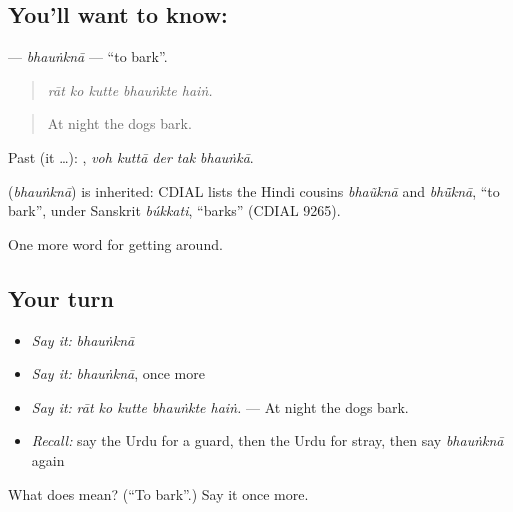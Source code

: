 \subsection*{You'll want to know: }
\textbf{} — \emph{bhauṅknā} — \textquotedblleft{}to bark\textquotedblright{}.

\begin{quote}
    
\end{quote}

\begin{quote}
\emph{rāt ko kutte bhauṅkte haiṅ.}
\end{quote}

\begin{quote}
At night the dogs bark.
\end{quote}

Past (it …):     , \emph{voh kuttā der tak bhauṅkā}.

\begin{cousinweb}
\textbf{} (\emph{bhauṅknā}) is inherited: CDIAL lists the Hindi cousins \emph{bhaũknā} and \emph{bhū̃knā}, \textquotedblleft{}to bark\textquotedblright{}, under Sanskrit \emph{búkkati}, \textquotedblleft{}barks\textquotedblright{} (CDIAL 9265).
\end{cousinweb}

\begin{grammarlens}[title={What you've built}]
One more word for getting around.
\end{grammarlens}

\subsection*{Your turn}
\begin{itemize}
\raggedright
  \item \emph{Say it:} \emph{bhauṅknā}
  \item \emph{Say it:} \emph{bhauṅknā}, once more
  \item \emph{Say it:} \emph{rāt ko kutte bhauṅkte haiṅ.} — At night the dogs bark.
  \item \emph{Recall:} say the Urdu for a guard, then the Urdu for stray, then say \emph{bhauṅknā} again
\end{itemize}

\begin{tcolorbox}[breakable,colback=teal!4,colframe=teal!35!black,title={Before you move on}]
What does  mean? (\textquotedblleft{}To bark\textquotedblright{}.) Say it once more.
\end{tcolorbox}

